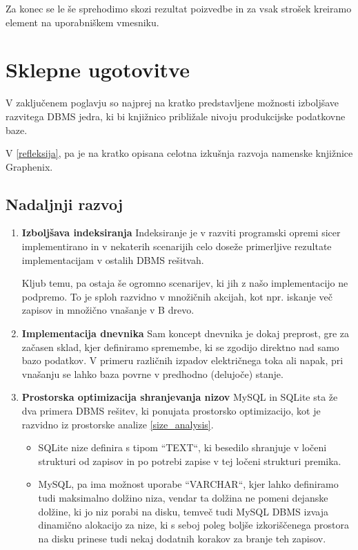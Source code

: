 \documentclass[a4paper,12pt,openright]{book}
\begin{document}
    \noindent
    Za konec se le še sprehodimo skozi rezultat poizvedbe in za vsak strošek kreiramo element na uporabniškem vmesniku.
    

\chapter{Sklepne ugotovitve}
    
    V zaključenem poglavju so najprej na kratko predstavljene možnosti izboljšave razvitega DBMS jedra, ki bi knjižnico približale nivoju produkcijske podatkovne baze.

    V \ref{refleksija}, pa je na kratko opisana celotna izkušnja razvoja namenske knjižnice Graphenix.
    
    \section{Nadaljnji razvoj}

    \begin{enumerate}
        \item \textbf{Izboljšava indeksiranja}
        \newline
        \noindent
        Indeksiranje je v razviti programski opremi sicer implementirano in v nekaterih scenarijih celo doseže primerljive rezultate implementacijam v ostalih DBMS rešitvah.

        Kljub temu, pa ostaja še ogromno scenarijev, ki jih z našo implementacijo ne podpremo. To je sploh razvidno v množičnih akcijah, kot npr. iskanje več zapisov in množično vnašanje v B drevo.

        \item \textbf{Implementacija dnevnika}
        \newline
        \noindent
        Sam koncept dnevnika je dokaj preprost, gre za začasen sklad, kjer definiramo spremembe, ki se zgodijo direktno nad samo bazo podatkov. V primeru različnih izpadov električnega toka ali napak, pri vnašanju se lahko baza povrne v predhodno (delujoče) stanje.

        \item \textbf{Prostorska optimizacija shranjevanja nizov}
        \newline
        \noindent
        MySQL in SQLite sta že dva primera DBMS rešitev, ki ponujata prostorsko optimizacijo, kot je razvidno iz prostorske analize \ref{size_analysis}.
        \begin{itemize}
            \item SQLite nize definira s tipom ``TEXT``, ki besedilo shranjuje v ločeni strukturi od zapisov in po potrebi zapise v tej ločeni strukturi premika.
            \item MySQL, pa ima možnost uporabe ``VARCHAR``, kjer lahko definiramo tudi maksimalno dolžino niza, vendar ta dolžina ne pomeni dejanske dolžine, ki jo niz porabi na disku, temveč tudi MySQL DBMS izvaja dinamično alokacijo za nize, ki s seboj poleg boljše izkoriščenega prostora na disku prinese tudi nekaj dodatnih korakov za branje teh zapisov.
        \end{itemize}
    \end{enumerate}
    
\end{document}
